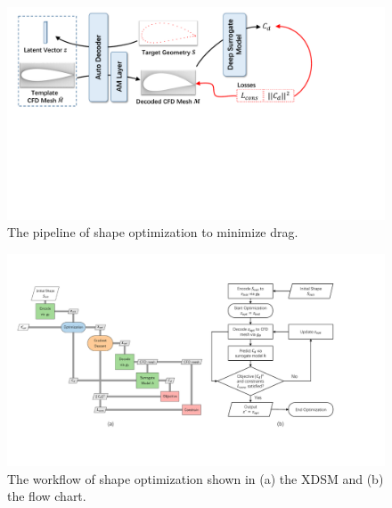 \begin{figure}[htb]
	\begin{center}
		\includegraphics[width=0.95\linewidth]{chapter3/tex/figures/experiment/shape_optimization_pipeline.pdf}
	\end{center}
	\caption{
		\small The pipeline of shape optimization to minimize drag.
	}
	\label{ch3:fig:exp_shape_optim_pipeline}
\end{figure}

\begin{figure}[htb]
	\begin{center}
		\includegraphics[width=1.02\linewidth]{chapter3/tex/figures/experiment/XDSM_flowchart.pdf}
	\end{center}
	\caption{
		\small The workflow of shape optimization shown in (a) the XDSM and (b) the flow chart.
	}
	\label{ch3:fig:exp_shape_optim_flow}
\end{figure}


